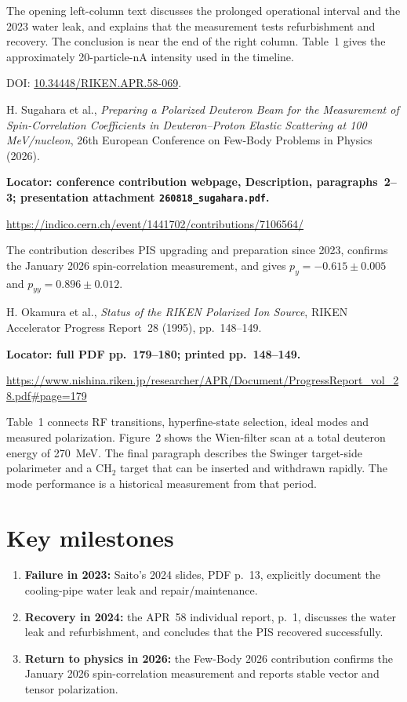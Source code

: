 \documentclass[11pt,a4paper]{article}
\begin{document}
\begin{enumerate}[label={\textbf{[\arabic*]}},leftmargin=2.7em,itemsep=0.8em]
The opening left-column text discusses the prolonged operational interval and the 2023 water leak, and explains that the measurement tests refurbishment and recovery. The conclusion is near the end of the right column. Table~1 gives the approximately 20-particle-nA intensity used in the timeline.

DOI: \href{https://doi.org/10.34448/RIKEN.APR.58-069}{10.34448/RIKEN.APR.58-069}.

\item H. Sugahara et al., \emph{Preparing a Polarized Deuteron Beam for the Measurement of Spin-Correlation Coefficients in Deuteron--Proton Elastic Scattering at 100 MeV/nucleon}, 26th European Conference on Few-Body Problems in Physics (2026).

\textbf{Locator: conference contribution webpage, Description, paragraphs~2--3; presentation attachment \texttt{260818\_sugahara.pdf}.}

\url{https://indico.cern.ch/event/1441702/contributions/7106564/}

The contribution describes PIS upgrading and preparation since 2023, confirms the January 2026 spin-correlation measurement, and gives $p_y=-0.615\pm0.005$ and $p_{yy}=0.896\pm0.012$.

\item H. Okamura et al., \emph{Status of the RIKEN Polarized Ion Source}, RIKEN Accelerator Progress Report~28 (1995), pp.~148--149.

\textbf{Locator: full PDF pp.~179--180; printed pp.~148--149.}

\url{https://www.nishina.riken.jp/researcher/APR/Document/ProgressReport_vol_28.pdf#page=179}

Table~1 connects RF transitions, hyperfine-state selection, ideal modes and measured polarization. Figure~2 shows the Wien-filter scan at a total deuteron energy of 270~MeV. The final paragraph describes the Swinger target-side polarimeter and a CH$_2$ target that can be inserted and withdrawn rapidly. The mode performance is a historical measurement from that period.
\end{enumerate}

\section{Key milestones}
\begin{enumerate}[leftmargin=1.5em]
\item \textbf{Failure in 2023:} Saito's 2024 slides, PDF p.~13, explicitly document the cooling-pipe water leak and repair/maintenance.
\item \textbf{Recovery in 2024:} the APR~58 individual report, p.~1, discusses the water leak and refurbishment, and concludes that the PIS recovered successfully.
\item \textbf{Return to physics in 2026:} the Few-Body 2026 contribution confirms the January 2026 spin-correlation measurement and reports stable vector and tensor polarization.
\end{enumerate}
\end{document}
